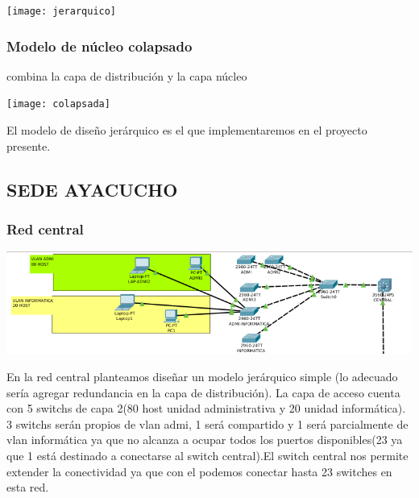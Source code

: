 \begin{center}
\texttt{[image: jerarquico]}
\end{center}

\subsubsection{ Modelo de n\'ucleo colapsado}
\begin{definicion}[]
{
 combina la capa de distribuci\'on y la capa n\'ucleo
 }
\end{definicion}
\texttt{[image: colapsada]}

El modelo de dise\~no jer\'arquico es el que implementaremos en el proyecto presente.

\subsection{SEDE AYACUCHO}
\subsubsection{Red central}
\includegraphics[scale=0.54]{img/central.png} 
\begin{definicion}[]
{
En la red central planteamos dise\~nar un modelo jer\'arquico simple (lo adecuado ser\'ia agregar redundancia en la capa de distribuci\'on). La capa de acceso cuenta con 5 switchs de capa 2(80 host unidad administrativa y 20 unidad inform\'atica). 3 switchs ser\'an propios de vlan admi, 1 ser\'a compartido y 1 ser\'a parcialmente de vlan inform\'atica ya que no alcanza a ocupar todos los puertos disponibles(23 ya que 1 est\'a destinado a conectarse al switch central).El switch central nos permite extender la conectividad ya que con el podemos conectar hasta 23 switches en esta red.
}
\end{definicion}

